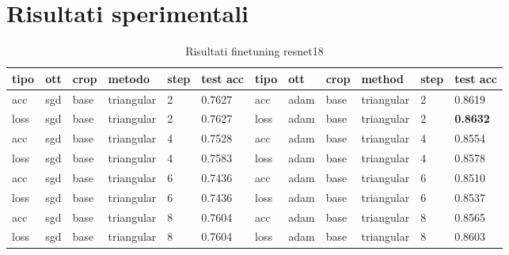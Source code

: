 \newpage
\appendix
\section{Risultati sperimentali}
\begin{table}[H]
\centering
\caption{Risultati finetuning resnet18}
\begin{adjustbox}{width=1\textwidth}
\begin{tabular}{|l|l|l|l|l|l||l|l|l|l|l|l|}
\hline
\textbf{tipo} & \textbf{ott} & \textbf{crop} & \textbf{metodo} & \textbf{step} & \textbf{test acc} & \textbf{tipo} & \textbf{ott} & \textbf{crop} & \textbf{method} & \textbf{step} & \textbf{test acc} \\ \hline
acc           & sgd          & base          & triangular      & 2             & 0.7627            & acc           & adam         & base          & triangular      & 2             & 0.8619   \\ \hline
loss          & sgd          & base          & triangular      & 2             & 0.7627            & loss          & adam         & base          & triangular      & 2             & \textbf{0.8632}            \\ \hline
acc           & sgd          & base          & triangular      & 4             & 0.7528            & acc           & adam         & base          & triangular      & 4             & 0.8554            \\ \hline
loss          & sgd          & base          & triangular      & 4             & 0.7583            & loss          & adam         & base          & triangular      & 4             & 0.8578            \\ \hline
acc           & sgd          & base          & triangular      & 6             & 0.7436            & acc           & adam         & base          & triangular      & 6             & 0.8510            \\ \hline
loss          & sgd          & base          & triangular      & 6             & 0.7436            & loss          & adam         & base          & triangular      & 6             & 0.8537            \\ \hline
acc           & sgd          & base          & triangular      & 8             & 0.7604            & acc           & adam         & base          & triangular      & 8             & 0.8565            \\ \hline
loss          & sgd          & base          & triangular      & 8             & 0.7604            & loss          & adam         & base          & triangular      & 8             & 0.8603            \\ \hline

\end{tabular}
\end{adjustbox}
\end{table}
